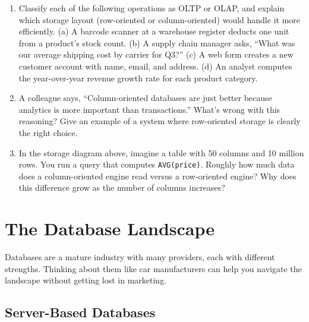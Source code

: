\documentclass[
  letterpaper,
  DIV=11,
  numbers=noendperiod]{scrreprt}
\begin{document}
\begin{tcolorbox}[enhanced jigsaw, opacitybacktitle=0.6, arc=.35mm, colback=white, bottomtitle=1mm, opacityback=0, toprule=.15mm, left=2mm, colbacktitle=quarto-callout-note-color!10!white, breakable, coltitle=black, toptitle=1mm, colframe=quarto-callout-note-color-frame, bottomrule=.15mm, titlerule=0mm, title=\textcolor{quarto-callout-note-color}{\faInfo}\hspace{0.5em}{Exercises}, rightrule=.15mm, leftrule=.75mm]

\begin{enumerate}
\def\labelenumi{\arabic{enumi}.}
\item
  Classify each of the following operations as OLTP or OLAP, and explain
  which storage layout (row-oriented or column-oriented) would handle it
  more efficiently. (a) A barcode scanner at a warehouse register
  deducts one unit from a product's stock count. (b) A supply chain
  manager asks, ``What was our average shipping cost by carrier for
  Q3?'' (c) A web form creates a new customer account with name, email,
  and address. (d) An analyst computes the year-over-year revenue growth
  rate for each product category.
\item
  A colleague says, ``Column-oriented databases are just better because
  analytics is more important than transactions.'' What's wrong with
  this reasoning? Give an example of a system where row-oriented storage
  is clearly the right choice.
\item
  In the storage diagram above, imagine a table with 50 columns and 10
  million rows. You run a query that computes \texttt{AVG(price)}.
  Roughly how much data does a column-oriented engine read versus a
  row-oriented engine? Why does this difference grow as the number of
  columns increases?
\end{enumerate}

\end{tcolorbox}

\section{The Database Landscape}\label{the-database-landscape}

Databases are a mature industry with many providers, each with different
strengths. Thinking about them like car manufacturers can help you
navigate the landscape without getting lost in marketing.

\subsection{Server-Based Databases}\label{server-based-databases}
\end{document}

